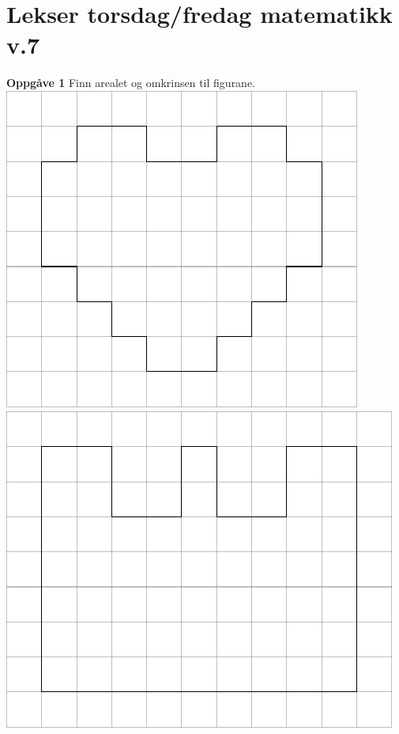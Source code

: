 


\Large
\section*{\huge Lekser torsdag/fredag matematikk v.7}
\textbf{Oppgåve 1}	\os
Finn arealet og omkrinsen til figurane. \os
\includegraphics[]{o4}\qquad  
\includegraphics[]{o3} \vsk

